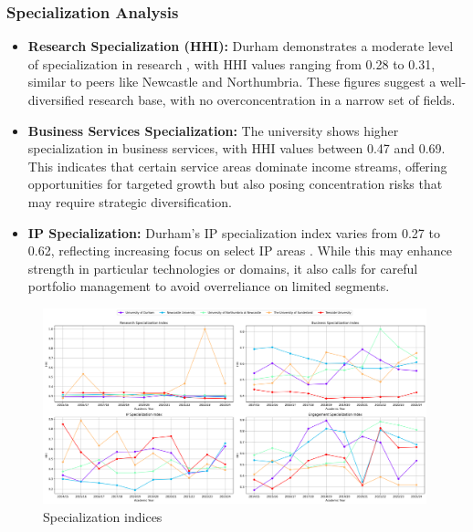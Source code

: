 \documentclass[journal,onecolumn, 10pt,draftclsnofoot]{IEEEtran}
\begin{document}
\subsubsection{Specialization Analysis}

\begin{itemize}
    \item \textbf{Research Specialization (HHI):} Durham demonstrates a moderate level of specialization in research \cite{porter1985competitive}, with HHI values ranging from 0.28 to 0.31, similar to peers like Newcastle and Northumbria. These figures suggest a well-diversified research base, with no overconcentration in a narrow set of fields.

\item \textbf{Business Services Specialization:} The university shows higher specialization in business services, with HHI values between 0.47 and 0.69. This indicates that certain service areas dominate income streams, offering opportunities for targeted growth but also posing concentration risks that may require strategic diversification.

\item \textbf{IP Specialization:} Durham's IP specialization index varies from 0.27 to 0.62, reflecting increasing focus on select IP areas \cite{teece1986profiting}. While this may enhance strength in particular technologies or domains, it also calls for careful portfolio management to avoid overreliance on limited segments.
\end{itemize}



\begin{figure}[h]
\centering
\includegraphics[width=0.99\textwidth]{Fig/figure37.specialization_indices.png}
\caption{Specialization indices}
\label{fig:specialization-indices}
\end{figure}
\end{document}
